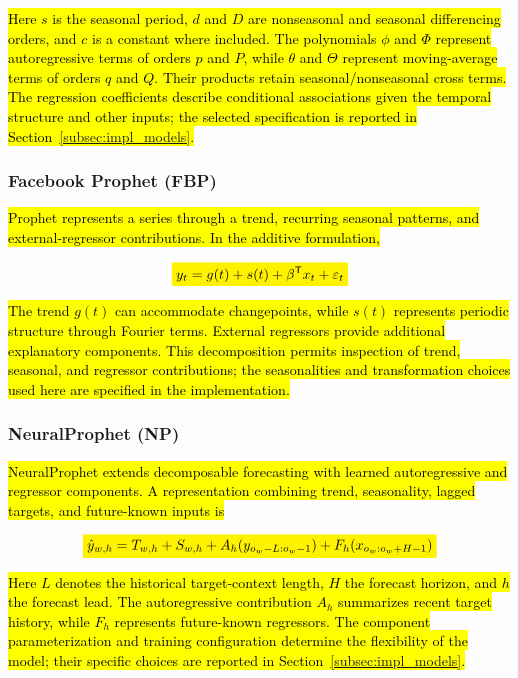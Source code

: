 \documentclass[pdflatex,sn-basic,Numbered]{sn-jnl}
\newcommand{\rev}[1]{\hl{#1}}
\newcommand{\revmath}[1]{\colorbox{yellow}{$\displaystyle #1$}}
\begin{document}
\rev{Here $s$ is the seasonal period, $d$ and $D$ are nonseasonal and seasonal differencing orders, and $c$ is a constant where included. The polynomials $\phi$ and $\Phi$ represent autoregressive terms of orders $p$ and $P$, while $\theta$ and $\Theta$ represent moving-average terms of orders $q$ and $Q$. Their products retain seasonal/nonseasonal cross terms. The regression coefficients describe conditional associations given the temporal structure and other inputs; the selected specification is reported in Section~\ref{subsec:impl_models}.}

\subsubsection{Facebook Prophet (FBP)}

\rev{Prophet represents a series through a trend, recurring seasonal patterns, and external-regressor contributions. In the additive formulation,}

\begin{equation}
\revmath{y_t=g(t)+s(t)+\beta^{\mathsf T}x_t+\varepsilon_t}
\label{eq:prophet}
\end{equation}

\rev{The trend $g(t)$ can accommodate changepoints, while $s(t)$ represents periodic structure through Fourier terms. External regressors provide additional explanatory components. This decomposition permits inspection of trend, seasonal, and regressor contributions; the seasonalities and transformation choices used here are specified in the implementation.}

\subsubsection{NeuralProphet (NP)}

\rev{NeuralProphet extends decomposable forecasting with learned autoregressive and regressor components. A representation combining trend, seasonality, lagged targets, and future-known inputs is}

\begin{equation}
\revmath{\hat y_{w,h}=T_{w,h}+S_{w,h}+A_h(y_{o_w-L:o_w-1})+F_h(x_{o_w:o_w+H-1})}
\label{eq:neuralprophet}
\end{equation}

\rev{Here $L$ denotes the historical target-context length, $H$ the forecast horizon, and $h$ the forecast lead. The autoregressive contribution $A_h$ summarizes recent target history, while $F_h$ represents future-known regressors. The component parameterization and training configuration determine the flexibility of the model; their specific choices are reported in Section~\ref{subsec:impl_models}.}
\end{document}

